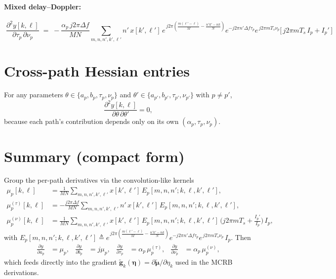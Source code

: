 \documentclass[11pt]{article}
\begin{document}
\paragraph{Mixed delay--Doppler:}
\begin{equation}
  \boxed{\;
  \frac{\partial^2 y[k,\ell]}{\partial \tau_p\,\partial \nu_p}
  \;=\; -\frac{\alpha_p\,j2\pi\Delta f}{MN}
        \sum_{m,n,n',k',\ell'} n'\,
        x[k',\ell']\,
        e^{\,j2\pi\!\left(\frac{m(\ell'-\ell)}{M}-\frac{n'k'-nk}{N}\right)}
        e^{-j2\pi n'\Delta f\tau_p}
        e^{\,j2\pi m T_s\nu_p}
        \bigl[\,j2\pi m T_s\,I_p + I_p'\,\bigr]
  \;}
\end{equation}

\section*{Cross-path Hessian entries}

For any parameters $\theta\in\{a_p,b_p,\tau_p,\nu_p\}$ and
$\theta'\in\{a_{p'},b_{p'},\tau_{p'},\nu_{p'}\}$ with $p\neq p'$,
\begin{equation}
  \frac{\partial^2 y[k,\ell]}{\partial \theta\,\partial \theta'} = 0,
\end{equation}
because each path's contribution depends only on its own
$(\alpha_p,\tau_p,\nu_p)$.

\section*{Summary (compact form)}

Group the per-path derivatives via the convolution-like kernels
\begin{align}
  \mu_p[k,\ell]
  &= \tfrac{1}{MN}\!\!\sum_{m,n,n',k',\ell'}
     x[k',\ell']\,E_p[m,n,n';k,\ell,k',\ell'],
  \\
  \mu_p^{(\tau)}[k,\ell]
  &= -\tfrac{j2\pi\Delta f}{MN}\!\!\sum_{m,n,n',k',\ell'}\!\! n'\,
     x[k',\ell']\,E_p[m,n,n';k,\ell,k',\ell'],
  \\
  \mu_p^{(\nu)}[k,\ell]
  &= \tfrac{1}{MN}\!\!\sum_{m,n,n',k',\ell'}
     x[k',\ell']\,E_p[m,n,n';k,\ell,k',\ell']\,
     \bigl(j2\pi m T_s + \tfrac{I_p'}{I_p}\bigr)\,I_p,
\end{align}
with
\(
  E_p[m,n,n';k,\ell,k',\ell']
  \triangleq
  e^{\,j2\pi(\frac{m(\ell'-\ell)}{M}-\frac{n'k'-nk}{N})}
  e^{-j2\pi n'\Delta f\tau_p}
  e^{\,j2\pi m T_s\nu_p}\,I_p.
\)
Then
\begin{equation}
  \begin{aligned}
    \tfrac{\partial y}{\partial a_p} &= \mu_p, &
    \tfrac{\partial y}{\partial b_p} &= j\mu_p, &
    \tfrac{\partial y}{\partial \tau_p} &= \alpha_p\,\mu_p^{(\tau)}, &
    \tfrac{\partial y}{\partial \nu_p} &= \alpha_p\,\mu_p^{(\nu)},
  \end{aligned}
\end{equation}
which feeds directly into the gradient
$\tilde{\bm g}_k(\bm\eta)=\partial\tilde{\bm\mu}/\partial\eta_k$ used in the
MCRB derivations.
\end{document}
